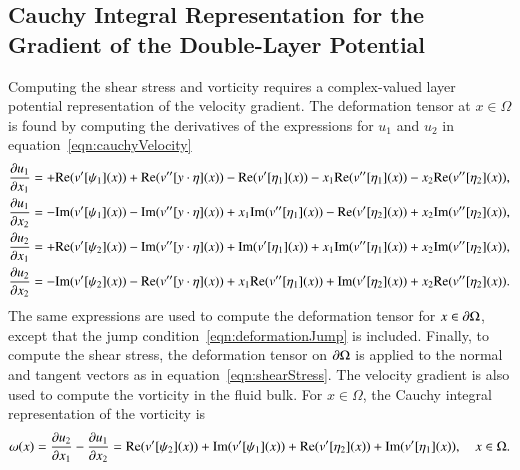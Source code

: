 \documentclass[preprint,10pt]{elsarticle}
\begin{document}
\subsection{Cauchy Integral Representation for the Gradient of the
Double-Layer Potential}
\label{sec:gradDLPcomplex}
Computing the shear stress and vorticity requires a complex-valued layer
potential representation of the velocity gradient.  The deformation
tensor at $x \in \Omega$ is found by computing the derivatives of the
expressions for $u_1$ and $u_2$ in equation~\eqref{eqn:cauchyVelocity}  
\begin{equation}
\label{eqn:cauchyGradient}
  \begin{aligned}
    \frac{\partial u_1}{\partial x_1} &= +{\operatorname{Re}} (v'[\psi_1](x)) + 
      {\operatorname{Re}} (v''[y\cdot\eta](x)) - {\operatorname{Re}} (v'[\eta_1](x)) - 
      x_1{\operatorname{Re}} (v''[\eta_1](x)) - x_2{\operatorname{Re}} (v''[\eta_2](x)), \\
    \frac{\partial u_1}{\partial x_2} &= - {\operatorname{Im}} (v'[\psi_1](x)) - 
      {\operatorname{Im}} (v''[y\cdot\eta](x)) + x_1{\operatorname{Im}} (v''[\eta_1](x)) - 
      {\operatorname{Re}} (v'[\eta_2](x)) + x_2{\operatorname{Im}} (v''[\eta_2](x)), \\
    \frac{\partial u_2}{\partial x_1} &= +{\operatorname{Re}} (v'[\psi_2](x)) - 
      {\operatorname{Im}} (v''[y\cdot\eta](x)) + {\operatorname{Im}} (v'[\eta_1](x)) +
      x_1{\operatorname{Im}} (v''[\eta_1](x)) + x_2{\operatorname{Im}} (v''[\eta_2](x)), \\
    \frac{\partial u_2}{\partial x_2} &= -{\operatorname{Im}} (v'[\psi_2](x)) - 
      {\operatorname{Re}} (v''[y\cdot\eta](x)) + x_1{\operatorname{Re}} (v''[\eta_1](x)) +
      {\operatorname{Im}} (v'[\eta_2](x)) + x_2{\operatorname{Re}} (v''[\eta_2](x)).
  \end{aligned}
\end{equation}
The same expressions are used to compute the deformation tensor for $x
\in {\partial}\Omega$, except that the jump
condition~\eqref{eqn:deformationJump} is included.  Finally, to compute
the shear stress, the deformation tensor on ${\partial}\Omega$ is applied to
the normal and tangent vectors as in equation~\eqref{eqn:shearStress}.
The velocity gradient is also used to compute the vorticity in the fluid
bulk.  For $x \in \Omega$, the Cauchy integral representation of the
vorticity is
\begin{align}
  \omega(x) = \frac{\partial u_2}{\partial x_1} - \frac{\partial u_1}{\partial x_2} = 
{\operatorname{Re}} (v'[\psi_2](x)) + {\operatorname{Im}} (v'[\psi_1](x)) 
 + {\operatorname{Re}} (v'[\eta_2](x))+ {\operatorname{Im}} (v'[\eta_1](x)), \quad x \in \Omega.
\end{align}


\end{document}
